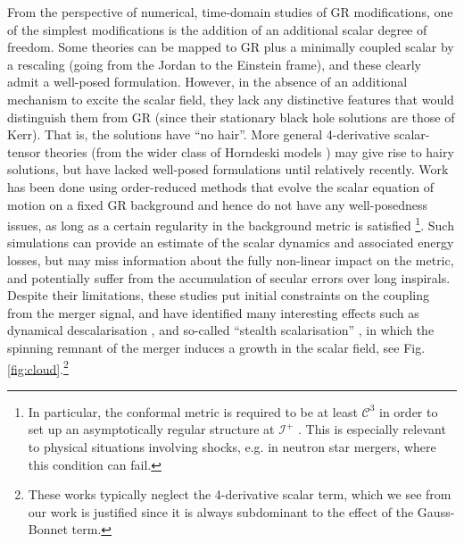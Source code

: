 \documentclass[reprint,aps,amsmath,amssymb,twoside,prd,showkeys,superscriptaddress,nofootinbib]{revtex4-2}
\begin{document}
From the perspective of numerical, time-domain studies of GR modifications, one of the simplest modifications is the addition of an additional scalar degree of freedom. 
Some theories can be mapped to GR plus a minimally coupled scalar by a rescaling (going from the Jordan to the Einstein frame), and these clearly admit a well-posed formulation. However, in the absence of an additional mechanism to excite the scalar field, they lack any distinctive features that would distinguish them from GR (since their stationary black hole solutions are those of Kerr). That is, the solutions have ``no hair''.
More general 4-derivative scalar-tensor theories (from the wider class of Horndeski models \cite{Horndeski:1974wa}) may give rise to hairy solutions, but have lacked well-posed formulations until relatively recently. Work has been done using order-reduced methods that  evolve the scalar equation of motion on a fixed GR background \cite{Richards:2023xsr,R:2022tqa,Okounkova:2022grv,Elley:2022ept,Doneva:2022byd,Okounkova:2020rqw,Silva:2020omi,Okounkova:2019zjf,Okounkova:2019dfo,Witek:2018dmd} and hence do not have any well-posedness issues, as long as a certain regularity in the background metric is satisfied \footnote{In particular, the conformal metric is required to be at least ${\mathcal C}^3$ in order to set up an asymptotically regular structure at $\mathcal{I}^+$ \cite{Penrose:1965am}. This is especially relevant to physical situations involving shocks, e.g. in neutron star mergers, where this condition can fail.}. Such simulations can provide an estimate of the scalar dynamics and associated energy losses, but may miss information about the fully non-linear impact on the metric, and potentially suffer from the accumulation of secular errors over long inspirals. Despite their limitations, these studies put initial constraints on the coupling from the merger signal, and have identified many interesting effects such as dynamical descalarisation \cite{Silva:2020omi}, and so-called ``stealth scalarisation'' \cite{Elley:2022ept}, in which the spinning remnant of the merger induces a growth in the scalar field, see Fig. \ref{fig:cloud}.\footnote{These works typically neglect the 4-derivative scalar term, which we see from our work is justified since it is always subdominant to the effect of the Gauss-Bonnet term.}
\end{document}
